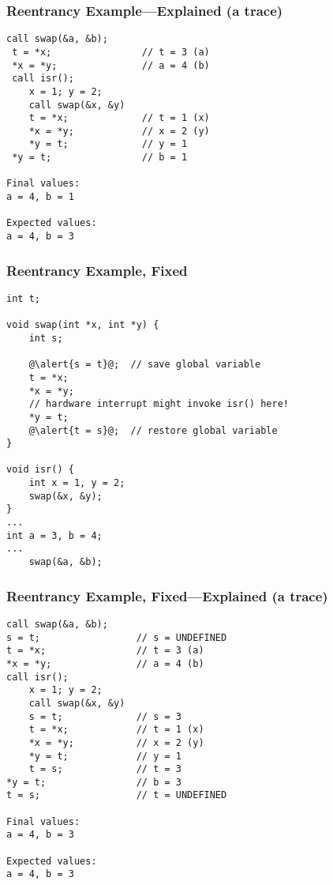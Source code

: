 \begin{frame}[fragile]
  \frametitle{Reentrancy Example---Explained (a trace)}

  
  \begin{lstlisting}
call swap(&a, &b);
 t = *x;                // t = 3 (a)
 *x = *y;               // a = 4 (b)
 call isr();
    x = 1; y = 2;
    call swap(&x, &y)
    t = *x;             // t = 1 (x)
    *x = *y;            // x = 2 (y)
    *y = t;             // y = 1
 *y = t;                // b = 1

Final values:
a = 4, b = 1

Expected values:
a = 4, b = 3
  \end{lstlisting}
  
\end{frame}

\begin{frame}[fragile]
  \frametitle{Reentrancy Example, Fixed}

  
  \begin{lstlisting}[escapechar=@]
int t;
 
void swap(int *x, int *y) {
    int s;
 
    @\alert{s = t}@;  // save global variable
    t = *x;
    *x = *y;
    // hardware interrupt might invoke isr() here!
    *y = t;
    @\alert{t = s}@;  // restore global variable
}
 
void isr() {
    int x = 1, y = 2;
    swap(&x, &y);
}
...
int a = 3, b = 4;
...
    swap(&a, &b);
  \end{lstlisting}
  
\end{frame}

\begin{frame}[fragile]
  \frametitle{Reentrancy Example, Fixed---Explained (a trace)}

  
  \begin{lstlisting}
call swap(&a, &b);
s = t;                 // s = UNDEFINED
t = *x;                // t = 3 (a)
*x = *y;               // a = 4 (b)
call isr();
    x = 1; y = 2;
    call swap(&x, &y)
    s = t;             // s = 3
    t = *x;            // t = 1 (x)
    *x = *y;           // x = 2 (y)
    *y = t;            // y = 1
    t = s;             // t = 3
*y = t;                // b = 3
t = s;                 // t = UNDEFINED

Final values:
a = 4, b = 3

Expected values:
a = 4, b = 3
  \end{lstlisting}
  
\end{frame}

